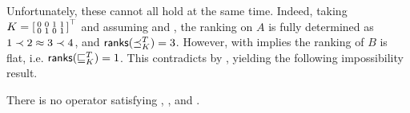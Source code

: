 Unfortunately, these cannot all hold at the same time. Indeed, taking
$
    K = \left[\begin{smallmatrix}
        0 & 0 & 1 & 1 \\
        0 & 1 & 0 & 1
    \end{smallmatrix}\right]^\top
$
and assuming \anon{} and \posresp{}, the ranking on $A$ is
fully determined as $1 \prec 2 \approx 3 \prec 4$, and $\mathsf{ranks}({\preceq_K^T}) = 3$.
However, \anon{} with \dualaxiom{} implies the ranking of $B$ is
flat, i.e.  $\mathsf{ranks}({\sqsubseteq_K^T}) = 1$. This contradicts \chaindef{} by
, yielding the following
impossibility result.

\begin{theorem}
    \label{tourn_result_chaindef_impossibility}

    There is no operator satisfying \chaindef{}, \anon{},
    \dualaxiom{} and \posresp{}.

\end{theorem}

